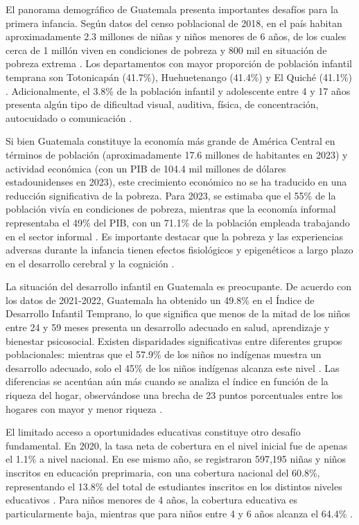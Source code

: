\documentclass[11pt,letterpaper]{report}
\begin{document}
El panorama demográfico de Guatemala presenta importantes desafíos para la 
primera infancia. Según datos del censo poblacional de 2018, en el país 
habitan aproximadamente 2.3 millones de niñas y niños menores de 6 años, de 
los cuales cerca de 1 millón viven en condiciones de pobreza y 800 mil en 
situación de pobreza extrema \cite{INE}. Los departamentos con mayor proporción 
de población infantil temprana son Totonicapán (41.7\%), Huehuetenango (41.4\%) 
y El Quiché (41.1\%) \cite{UNICEFAtlas}. Adicionalmente, el 3.8\% de la 
población infantil y adolescente entre 4 y 17 años presenta algún tipo de 
dificultad visual, auditiva, física, de concentración, autocuidado o 
comunicación \cite{INE}.

Si bien Guatemala constituye la economía más grande de América Central en
términos de población (aproximadamente 17.6 millones de habitantes en 2023) y
actividad económica (con un PIB de 104.4 mil millones de dólares
estadounidenses en 2023), este crecimiento económico no se ha traducido en una
reducción significativa de la pobreza. Para 2023, se estimaba que el 55\% de la
población vivía en condiciones de pobreza, mientras que la economía informal
representaba el 49\% del PIB, con un 71.1\% de la población empleada trabajando
en el sector informal \cite{WorldBankGuate}. Es importante destacar que la
pobreza y las experiencias adversas durante la infancia tienen efectos
fisiológicos y epigenéticos a largo plazo en el desarrollo cerebral y la
cognición \cite{Luby_2015, Noble_2015}.

La situación del desarrollo infantil en Guatemala es preocupante. De acuerdo
con los datos de 2021-2022, Guatemala ha obtenido un 49.8\% en el Índice de
Desarrollo Infantil Temprano, lo que significa que menos de la mitad de los
niños entre 24 y 59 meses presenta un desarrollo adecuado en salud, aprendizaje
y bienestar psicosocial. Existen disparidades significativas entre diferentes
grupos poblacionales: mientras que el 57.9\% de los niños no indígenas muestra
un desarrollo adecuado, solo el 45\% de los niños indígenas alcanza este nivel
\cite{SESAN2022}. Las diferencias se acentúan aún más cuando se analiza el
índice en función de la riqueza del hogar, observándose una brecha de 23 puntos
porcentuales entre los hogares con mayor y menor riqueza \cite{UNICEFGuate}.

El limitado acceso a oportunidades educativas constituye otro desafío 
fundamental. En 2020, la tasa neta de cobertura en el nivel inicial fue de 
apenas el 1.1\% a nivel nacional. En ese mismo año, se registraron 597,195 
niñas y niños inscritos en educación preprimaria, con una cobertura nacional 
del 60.8\%, representando el 13.8\% del total de estudiantes inscritos en los 
distintos niveles educativos \cite{PoliticaInfanciaGuate}. Para niños menores 
de 4 años, la cobertura educativa es particularmente baja, mientras que para 
niños entre 4 y 6 años alcanza el 64.4\% \cite{MineducEstadistica}.
\end{document}
